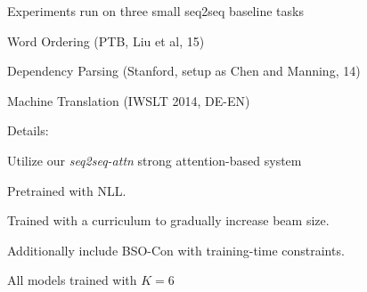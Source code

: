 \documentclass{beamer}
\let\tempone\itemize
\let\temptwo\enditemize
\renewenvironment{itemize}{\tempone\addtolength{\itemsep}{0.5\baselineskip}}{\temptwo}
\newcommand{\air}{\vspace{0.25cm}}
\newcommand{\Cite}[1]{{\footnotesize \citep{#1}}}
\begin{document}







\begin{frame}
  \centerline{}
  \air 

  Experiments run on three small seq2seq baseline tasks

  \begin{itemize}
  \item Word Ordering (PTB, Liu et al, 15)
  \item Dependency Parsing (Stanford, setup as Chen and Manning, 14) 
  \item Machine Translation (IWSLT 2014, DE-EN)
  \end{itemize}



  Details:
  \begin{itemize}
  \item Utilize our \textit{seq2seq-attn} strong attention-based system 
  \item Pretrained with NLL. 
  \item Trained with a curriculum to gradually increase beam size.
  \item Additionally include BSO-Con with training-time constraints.
  \item All models trained with $K=6$
  \end{itemize}
 
\end{frame}
\end{document}
